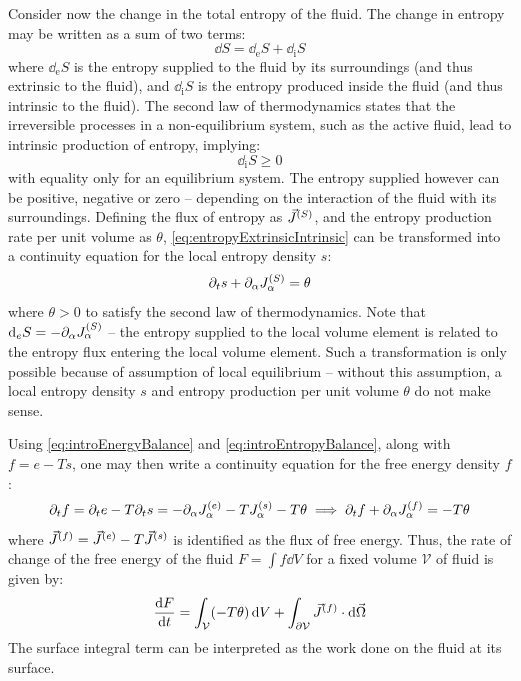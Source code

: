 Consider now the change in the total entropy of the fluid. The change in entropy may be written as a sum of two terms:
\begin{equation}\label{eq:entropyExtrinsicIntrinsic}
    \dd{S} = \dd_{\textrm{e}}S + \dd_{\textrm{i}}S
\end{equation}
where $\dd_{\textrm{e}}S$ is the entropy supplied to the fluid by its surroundings (and thus extrinsic to the fluid), and $\dd_{\textrm{i}}S$ is the entropy produced inside the fluid (and thus intrinsic to the fluid). The second law of thermodynamics states that the irreversible processes in a non-equilibrium system, such as the active fluid, lead to intrinsic production of entropy, implying:
\begin{equation*}
    \dd_{\textrm{i}}S \geq 0
\end{equation*}
with equality only for an equilibrium system. The entropy supplied however can be positive, negative or zero -- depending on the interaction of the fluid with its surroundings. Defining the flux of entropy as $\vec{J}^{(S)}$, and the entropy production rate per unit volume as $\theta$, \autoref{eq:entropyExtrinsicIntrinsic} can be transformed into a continuity equation for the local entropy density $s$:
\begin{equation}\label{eq:introEntropyBalance}
    \inlinePartial{t}{s} + \inlinePartial{\alpha}{\speciesSuper{J}{S}_\alpha} = \theta
\end{equation}
where $\theta > 0$ to satisfy the second law of thermodynamics. Note that $\dd_e S = -\inlinePartial{\alpha}{\speciesSuper{J}{S}_\alpha}$ -- the entropy supplied to the local volume element is related to the entropy flux entering the local volume element. Such a transformation is only possible because of assumption of local equilibrium -- without this assumption, a local entropy density $s$ and entropy production per unit volume $\theta$ do not make sense.

Using \autoref{eq:introEnergyBalance} and \autoref{eq:introEntropyBalance}, along with $f = e - Ts$, one may then write a continuity equation for the free energy density $f$:
\begin{equation}\label{eq:introFreeEnergyBalance}
    \inlinePartial{t}{f} = \inlinePartial{t}{e} - T\inlinePartial{t}{s} = -\inlinePartial{\alpha}{\speciesSuper{J}{e}_\alpha - T\speciesSuper{J}{s}_\alpha} -T\theta \implies \inlinePartial{t}{f} + \inlinePartial{\alpha}{\speciesSuper{J}{f}_\alpha} = -T\theta 
\end{equation}
where $\vec{J}^{(f)} = \vec{J}^{(e)} - T\vec{J}^{(s)}$ is identified as the flux of free energy. Thus, the rate of change of the free energy of the fluid $F = \int f \dd{V}$ for a fixed volume $\mathcal{V}$ of fluid is given by:
\begin{equation}\label{eq:introTotalFreeEnergyTimeDerivativeEntropyProduction}
    \dv{F}{t} = \int_{\mathcal{V}} (-T\theta) \dd{V} + \int_{\partial \mathcal{V}} \vec{J}^{(f)}\cdot\dd{\vec{\Omega}}
\end{equation}
The surface integral term can be interpreted as the work done on the fluid at its surface.


